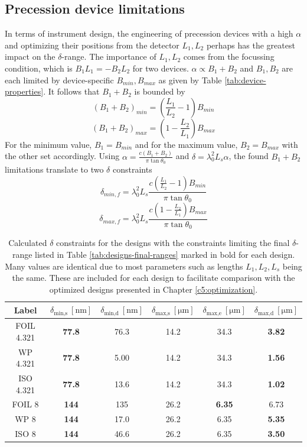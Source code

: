 \subsection{Precession device limitations}
\label{c4.1.1}
In terms of instrument design, the engineering of precession devices with a high $\alpha$ and optimizing their positions from the detector $L_1, L_2$ perhaps has the greatest impact on the $\delta$-range. The importance of $L_1, L_2$ comes from the focussing condition, which is $B_1L_1 = -B_2L_2$ for two devices. $\alpha\propto B_1 + B_2$ and $B_1, B_2$ are each limited by device-specific $B_{min}, B_{max}$ as given by Table \ref{tab:device-properties}. It follows that $B_1 + B_2$ is bounded by
$$(B_1 + B_2)_{min} = (\frac{L_1}{L_2} - 1)B_{min}$$
$$(B_1 + B_2)_{max} = (1 - \frac{L_2}{L_1})B_{max}$$
For the minimum value, $B_1 = B_{min}$ and for the maximum value, $B_2 = B_{max}$ with the other set accordingly. Using $\alpha = \frac{c(B_1+B_2)}{\pi\tan\theta_0}$ and $\delta = \lambda_0^2L_s\alpha$, the found $B_1 + B_2$ limitations translate to two $\delta$ constraints
$$\delta_{min, f} = \lambda_0^2 L_s \frac{c(\frac{L_1}{L_2} - 1)B_{min}}{\pi\tan\theta_0}$$
$$\delta_{max, f} = \lambda_0^2 L_s \frac{c(1 - \frac{L_2}{L_1})B_{max}}{\pi\tan\theta_0}$$

\begin{table}[h!]
	\centering
	\begin{tabular}{c | c c | c c c}
		\toprule
		Label & $\delta_{\text{min,s}} ~[\unit{\nano\meter}]$ & $\delta_{\text{min,d}} ~[\unit{\nano\meter}]$ & $\delta_{\text{max,s}}~[\unit{\micro\meter}]$& $\delta_{\text{max,e}} ~[\unit{\micro\meter}]$ & $\delta_{\text{max,d}} ~[\unit{\micro\meter}]$ \\
		\midrule
		FOIL 4.321 & \textbf{77.8} & \num{76.3} & \num{14.2} & \num{34.3} & \textbf{3.82} \\
		WP 4.321 & \textbf{77.8} & \num{5.00} & \num{14.2} & \num{34.3} & \textbf{1.56} \\
		ISO 4.321 & \textbf{77.8} & \num{13.6} & \num{14.2} & \num{34.3} & \textbf{1.02} \\
		FOIL 8 & \textbf{144} & \num{135} & \num{26.2} & \textbf{6.35} & \num{6.73} \\
		WP 8 & \textbf{144} & \num{17.0} & \num{26.2} & \num{6.35} & \textbf{5.35} \\
		ISO 8 & \textbf{144} & \num{46.6} & \num{26.2} & \num{6.35} & \textbf{3.50} \\
		\bottomrule
	\end{tabular}
	\caption{Calculated $\delta$ constraints for the designs with the constraints limiting the final $\delta$-range listed in Table \ref{tab:designs-final-ranges} marked in bold for each design. Many values are identical due to most parameters such as lengths $L_1, L_2, L_s$ being the same. These are included for each design to facilitate comparison with the optimized designs presented in Chapter \ref{c5:optimization}.}
	\label{tab:designs-delta-constraints}
\end{table}

